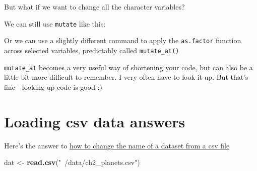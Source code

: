 \documentclass[
]{book}
\newenvironment{Shaded}{\begin{snugshade}}{\end{snugshade}}
\newcommand{\DataTypeTok}[1]{\textcolor[rgb]{0.13,0.29,0.53}{#1}}
\newcommand{\KeywordTok}[1]{\textcolor[rgb]{0.13,0.29,0.53}{\textbf{#1}}}
\newcommand{\NormalTok}[1]{#1}
\newcommand{\OperatorTok}[1]{\textcolor[rgb]{0.81,0.36,0.00}{\textbf{#1}}}
\newcommand{\StringTok}[1]{\textcolor[rgb]{0.31,0.60,0.02}{#1}}
\begin{document}
But what if we want to change all the character variables?

We can still use \texttt{mutate} like this:

\begin{Shaded}
\end{Shaded}

Or we can use a slightly different command to apply the \texttt{as.factor} function across selected variables, predictably called \texttt{mutate\_at()}

\begin{Shaded}
\end{Shaded}

\texttt{mutate\_at} becomes a very useful way of shortening your code, but can also be a little bit more difficult to remember. I very often have to look it up. But that's fine - looking up code is good :)

\hypertarget{ans_loadcsv}{%
\section{Loading csv data answers}\label{ans_loadcsv}}

Here's the answer to \protect\hyperlink{ex_loadcsv}{how to change the name of a dataset from a csv file}

\begin{Shaded}
\begin{Highlighting}[]
\NormalTok{dat <-}\StringTok{ }\KeywordTok{read.csv}\NormalTok{(}\StringTok{"~/data/ch2_planets.csv"}\NormalTok{)}
\end{Highlighting}
\end{Shaded}
\end{document}
